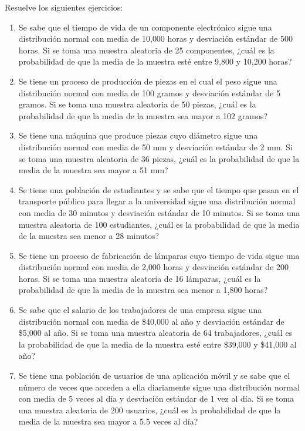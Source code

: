 \begin{Ejer}
Resuelve los siguientes ejercicios:
\begin{enumerate}

    \item Se sabe que el tiempo de vida de un componente electrónico sigue una distribución normal con media de 10{,}000 horas y desviación estándar de 500 horas. Si se toma una muestra aleatoria de 25 componentes, ¿cuál es la probabilidad de que la media de la muestra esté entre 9{,}800 y 10{,}200 horas?

    \item Se tiene un proceso de producción de piezas en el cual el peso sigue una distribución normal con media de 100 gramos y desviación estándar de 5 gramos. Si se toma una muestra aleatoria de 50 piezas, ¿cuál es la probabilidad de que la media de la muestra sea mayor a 102 gramos?

    \item Se tiene una máquina que produce piezas cuyo diámetro sigue una distribución normal con media de 50 mm y desviación estándar de 2 mm. Si se toma una muestra aleatoria de 36 piezas, ¿cuál es la probabilidad de que la media de la muestra sea mayor a 51 mm?

    \item Se tiene una población de estudiantes y se sabe que el tiempo que pasan en el transporte público para llegar a la universidad sigue una distribución normal con media de 30 minutos y desviación estándar de 10 minutos. Si se toma una muestra aleatoria de 100 estudiantes, ¿cuál es la probabilidad de que la media de la muestra sea menor a 28 minutos?

    \item Se tiene un proceso de fabricación de lámparas cuyo tiempo de vida sigue una distribución normal con media de 2{,}000 horas y desviación estándar de 200 horas. Si se toma una muestra aleatoria de 16 lámparas, ¿cuál es la probabilidad de que la media de la muestra sea menor a 1{,}800 horas?

    \item Se sabe que el salario de los trabajadores de una empresa sigue una distribución normal con media de \$40{,}000 al año y desviación estándar de \$5{,}000 al año. Si se toma una muestra aleatoria de 64 trabajadores, ¿cuál es la probabilidad de que la media de la muestra esté entre \$39{,}000 y \$41{,}000 al año?

    \item Se tiene una población de usuarios de una aplicación móvil y se sabe que el número de veces que acceden a ella diariamente sigue una distribución normal con media de 5 veces al día y desviación estándar de 1 vez al día. Si se toma una muestra aleatoria de 200 usuarios, ¿cuál es la probabilidad de que la media de la muestra sea mayor a 5.5 veces al día?


\end{enumerate}
\end{Ejer}
